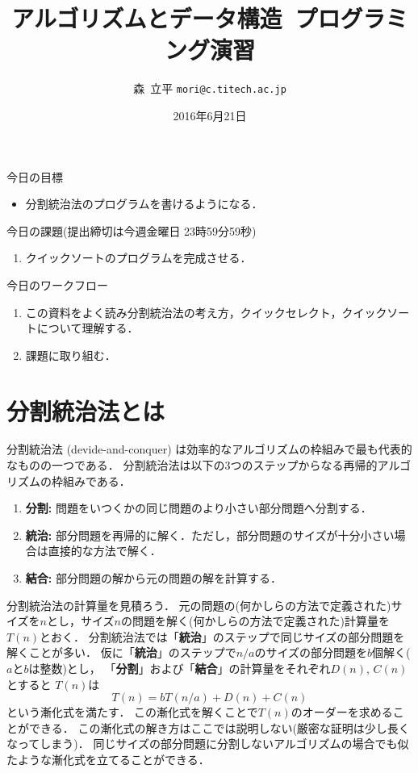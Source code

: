 \documentclass[a4paper,twoside,onecolumn,openany,article]{memoir}
\title{アルゴリズムとデータ構造~プログラミング演習}
\date{2016年6月21日}
\author{森~立平 \texttt{mori@c.titech.ac.jp}}
\theoremstyle{remark}
\begin{document}
\maketitle

\noindent
今日の目標
\begin{itemize}
\item 分割統治法のプログラムを書けるようになる．
\end{itemize}

\noindent
今日の課題(提出締切は今週金曜日 23時59分59秒)
\begin{enumerate}
\item クイックソートのプログラムを完成させる．
\end{enumerate}

\noindent
今日のワークフロー
\begin{enumerate}
\item この資料をよく読み分割統治法の考え方，クイックセレクト，クイックソートについて理解する．
\item 課題に取り組む．
\end{enumerate}

\section{分割統治法とは}
分割統治法 (devide-and-conquer) は効率的なアルゴリズムの枠組みで最も代表的なものの一つである．
分割統治法は以下の3つのステップからなる再帰的アルゴリズムの枠組みである．
\begin{enumerate}
\item \textbf{分割:} 問題をいつくかの同じ問題のより小さい部分問題へ分割する．
\item \textbf{統治:} 部分問題を再帰的に解く．ただし，部分問題のサイズが十分小さい場合は直接的な方法で解く．
\item \textbf{結合:} 部分問題の解から元の問題の解を計算する．
\end{enumerate}
分割統治法の計算量を見積ろう．
元の問題の(何かしらの方法で定義された)サイズを$n$とし，サイズ$n$の問題を解く(何かしらの方法で定義された)計算量を$T(n)$とおく．
分割統治法では「\textbf{統治}」のステップで同じサイズの部分問題を解くことが多い．
仮に「\textbf{統治}」のステップで$n/a$のサイズの部分問題を$b$個解く($a$と$b$は整数)とし，
「\textbf{分割}」および「\textbf{結合}」の計算量をそれぞれ$D(n)$, $C(n)$ とすると
$T(n)$は
\begin{equation*}
T(n) = bT(n/a) + D(n) + C(n)
\end{equation*}
という漸化式を満たす．
この漸化式を解くことで$T(n)$のオーダーを求めることができる．
この漸化式の解き方はここでは説明しない(厳密な証明は少し長くなってしまう)．
同じサイズの部分問題に分割しないアルゴリズムの場合でも似たような漸化式を立てることができる．
\end{document}
